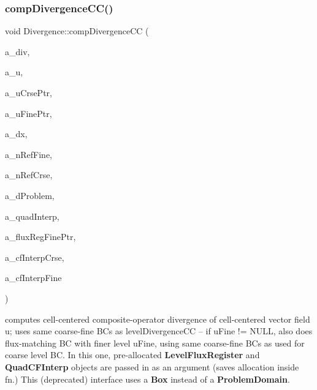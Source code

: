 \subsubsection{\texorpdfstring{comp\+Divergence\+C\+C()}{compDivergenceCC()}\hspace{0.1cm}{\footnotesize\ttfamily [4/4]}}
{\footnotesize\ttfamily void Divergence\+::comp\+Divergence\+CC (\begin{DoxyParamCaption}\item[{\textbf{ Level\+Data}$<$ \textbf{ F\+Array\+Box} $>$ \&}]{a\+\_\+div,  }\item[{\textbf{ Level\+Data}$<$ \textbf{ F\+Array\+Box} $>$ \&}]{a\+\_\+u,  }\item[{\textbf{ Level\+Data}$<$ \textbf{ F\+Array\+Box} $>$ $\ast$}]{a\+\_\+u\+Crse\+Ptr,  }\item[{\textbf{ Level\+Data}$<$ \textbf{ F\+Array\+Box} $>$ $\ast$}]{a\+\_\+u\+Fine\+Ptr,  }\item[{const \textbf{ Real}}]{a\+\_\+dx,  }\item[{const int}]{a\+\_\+n\+Ref\+Fine,  }\item[{const int}]{a\+\_\+n\+Ref\+Crse,  }\item[{const \textbf{ Box} \&}]{a\+\_\+d\+Problem,  }\item[{const bool}]{a\+\_\+quad\+Interp,  }\item[{\textbf{ Level\+Flux\+Register} $\ast$}]{a\+\_\+flux\+Reg\+Fine\+Ptr,  }\item[{\textbf{ Quad\+C\+F\+Interp} \&}]{a\+\_\+cf\+Interp\+Crse,  }\item[{\textbf{ Quad\+C\+F\+Interp} \&}]{a\+\_\+cf\+Interp\+Fine }\end{DoxyParamCaption})\hspace{0.3cm}{\ttfamily [static]}}

computes cell-\/centered composite-\/operator divergence of cell-\/centered vector field u; uses same coarse-\/fine BC\textquotesingle{}s as level\+Divergence\+CC -- if u\+Fine != N\+U\+LL, also does flux-\/matching BC with finer level u\+Fine, using same coarse-\/fine BC\textquotesingle{}s as used for coarse level BC. In this one, pre-\/allocated \textbf{ Level\+Flux\+Register} and \textbf{ Quad\+C\+F\+Interp} objects are passed in as an argument (saves allocation inside fn.) This (deprecated) interface uses a \textbf{ Box} instead of a \textbf{ Problem\+Domain}. \mbox{\label{class_divergence_acd62afebbe823676309ba7301578ea96}} 
